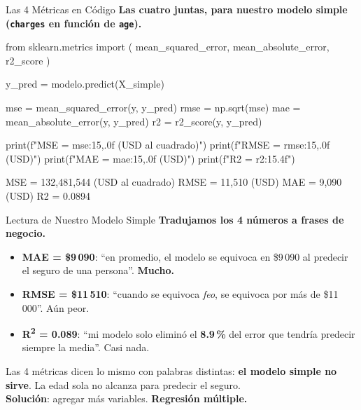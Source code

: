 \documentclass[aspectratio=169, 11pt]{beamer}
\begin{document}
\begin{frame}[fragile,shrink=46]{Las 4 Métricas en Código}
  \vspace{-6pt}
  {\footnotesize\color{arcaDark}\bfseries
    Las cuatro juntas, para nuestro modelo simple (\texttt{charges} en función de \texttt{age}).}

  \vspace{4pt}
  \begin{pyblock}
from sklearn.metrics import (
    mean_squared_error, mean_absolute_error, r2_score
)

y_pred = modelo.predict(X_simple)

mse  = mean_squared_error(y, y_pred)
rmse = np.sqrt(mse)
mae  = mean_absolute_error(y, y_pred)
r2   = r2_score(y, y_pred)

print(f"MSE  = {mse:15,.0f}   (USD al cuadrado)")
print(f"RMSE = {rmse:15,.0f}   (USD)")
print(f"MAE  = {mae:15,.0f}   (USD)")
print(f"R2   = {r2:15.4f}")
  \end{pyblock}

  \vspace{4pt}
  \begin{outputblock}
MSE  =     132,481,544   (USD al cuadrado)
RMSE =          11,510   (USD)
MAE  =           9,090   (USD)
R2   =          0.0894
  \end{outputblock}
\end{frame}

\begin{frame}[shrink=5]{Lectura de Nuestro Modelo Simple}
  \vspace{-4pt}
  {\footnotesize\color{arcaDark}\bfseries
    Tradujamos los 4 números a frases de negocio.}

  \vspace{8pt}
  {\scriptsize
  \begin{itemize}\setlength{\itemsep}{6pt}
    \item[{\color{arcaRed}\faArrowRight}]
      \textbf{MAE = \$9\,090}: ``en promedio, el modelo se equivoca en \$9\,090
      al predecir el seguro de una persona''. \textbf{Mucho.}
    \item[{\color{arcaRed}\faArrowRight}]
      \textbf{RMSE = \$11\,510}: ``cuando se equivoca \textit{feo}, se
      equivoca por más de \$11\,000''. Aún peor.
    \item[{\color{arcaRed}\faArrowRight}]
      \textbf{R\textsuperscript{2} = 0.089}: ``mi modelo solo eliminó el
      \textbf{8.9\,\%} del error que tendría predecir siempre la media''. Casi nada.
  \end{itemize}
  }

  \vspace{6pt}
  {\footnotesize\color{arcaDark}
    \faLightbulb\hspace{4pt}
    Las 4 métricas dicen lo mismo con palabras distintas: \textbf{el modelo
    simple no sirve}. La edad sola no alcanza para predecir el seguro.\\
    \textbf{Solución}: agregar más variables. \textbf{Regresión múltiple.}}
\end{frame}
\end{document}
